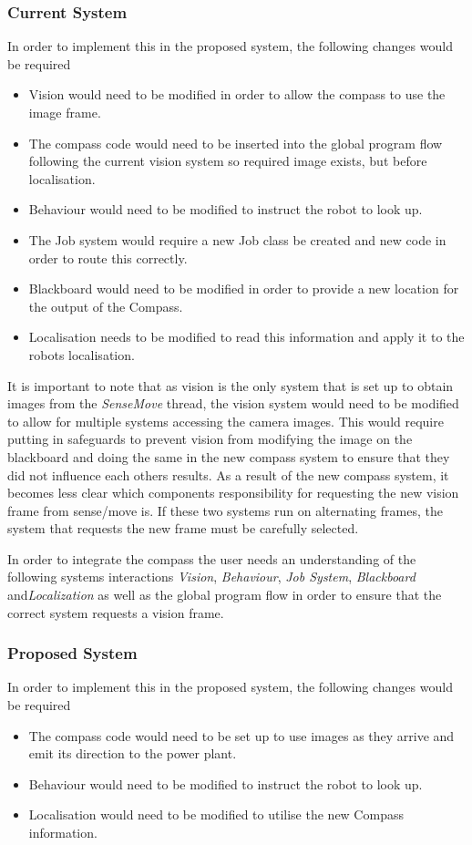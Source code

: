\documentclass[english,12pt]{scrartcl}
\begin{document}
			\subsubsection{Current System}
				In order to implement this in the proposed system, the following changes would be required
				
				\begin{itemize}
					\item Vision would need to be modified in order to allow the compass to use the image frame.
					\item The compass code would need to be inserted into the global program flow following the current vision system so required image exists, but before localisation.
					\item Behaviour would need to be modified to instruct the robot to look up.
					\item The Job system would require a new Job class be created and new code in order to route this correctly.
					\item Blackboard would need to be modified in order to provide a new location for the output of the Compass.
					\item Localisation needs to be modified to read this information and apply it to the robots localisation.
				\end{itemize}
			
				It is important to note that as vision is the only system that is set up to obtain images from the \emph{SenseMove} thread, the vision system would need to be modified to allow for multiple systems accessing the camera images.
				This would require putting in safeguards to prevent vision from modifying the image on the blackboard and doing the same in the new compass system to ensure that they did not influence each others results.
				As a result of the new compass system, it becomes less clear which components responsibility for requesting the new vision frame from sense/move is. If these two systems run on alternating frames, the system that requests the new frame must be carefully selected.
				
				In order to integrate the compass the user needs an understanding of the following systems interactions \emph{Vision}, \emph{Behaviour}, \emph{Job System}, \emph{Blackboard} and\emph{Localization} as well as the global program flow in order to ensure that the correct system requests a vision frame.
				
			\subsubsection{Proposed System}
				In order to implement this in the proposed system, the following changes would be required				
				\begin{itemize}
					\item The compass code would need to be set up to use images as they arrive and emit its direction to the power plant.
					\item Behaviour would need to be modified to instruct the robot to look up.
					\item Localisation would need to be modified to utilise the new Compass information.
				\end{itemize}
				
\end{document}
